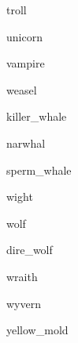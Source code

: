 \documentclass[letterpaper,serif]{module}
\begin{document}
\begin{newmonster}{troll}\end{newmonster}

\begin{newmonster}{unicorn}\end{newmonster}

\begin{newmonster}{vampire}\end{newmonster}

\begin{newmonster}{weasel}\end{newmonster}


\begin{newmonster}{killer_whale}\end{newmonster}

\begin{newmonster}{narwhal}\end{newmonster}

\begin{newmonster}{sperm_whale}\end{newmonster}

\begin{newmonster}{wight}\end{newmonster}


\begin{newmonster}{wolf}\end{newmonster}

\begin{newmonster}{dire_wolf}\end{newmonster}

\begin{newmonster}{wraith}\end{newmonster}

\begin{newmonster}{wyvern}\end{newmonster}

\begin{newmonster}{yellow_mold}\end{newmonster}
\end{document}
